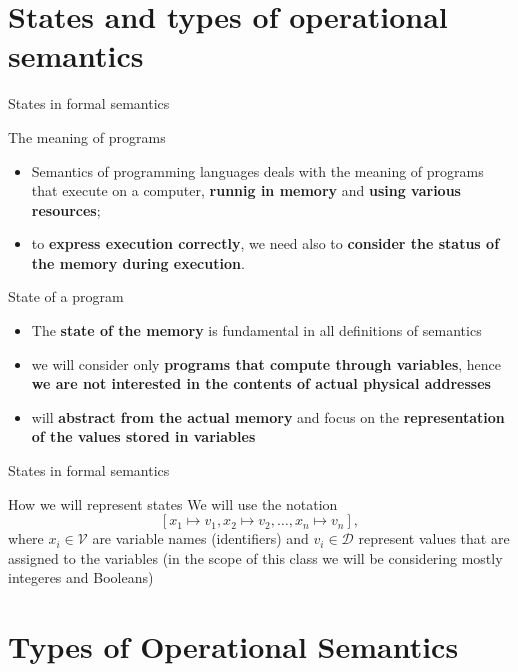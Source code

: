 \documentclass[aspectratio=169]{beamer}
\begin{document}
\section{States and types of operational semantics}

\begin{slide}{States in formal semantics}
  \begin{block}{The meaning of programs}
  \begin{itemize}
    \item Semantics of programming languages deals with the meaning of programs that execute on a computer, \textbf{runnig in memory} and \textbf{using various resources};
    \item to \textbf{express execution correctly}, we need also to \textbf{consider the status of the memory
during execution}.
  \end{itemize}
  \end{block}
  
  \begin{block}{State of a program}
    \begin{itemize}
    \item The \textbf{state of the memory} is fundamental in all definitions of semantics  
    \item we will consider only \textbf{programs that compute through variables}, hence \textbf{we are not interested in the contents of actual physical addresses}
    \item will \textbf{abstract from the actual memory} and focus on the \textbf{representation of the values stored in variables}
    \end{itemize}
  \end{block}
\end{slide}

\begin{slide}{States in formal semantics}
\begin{block}{How we will represent states}
We will use the notation $$[x_1 \mapsto v_1, x_2 \mapsto v_2, \ldots, x_n \mapsto v_n], $$ where $x_i \in \mathcal{V}$ are variable names (identifiers) and $v_i \in \mathcal{D}$ represent values that are assigned to the variables (in the scope of this class we will be considering mostly integeres and Booleans)  
\end{block}
\end{slide}

\section*{Types of Operational Semantics}
\end{document}
